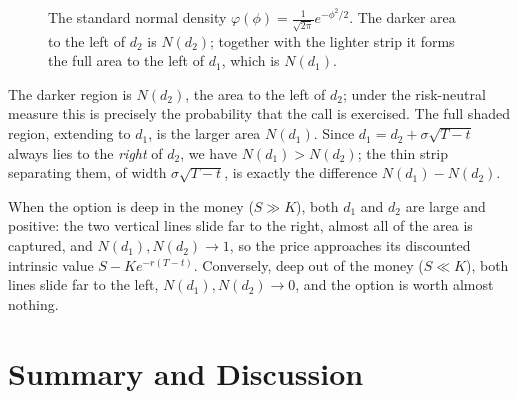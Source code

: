 \documentclass[a4paper,12pt]{article}
\numberwithin{equation}{section}
\begin{document}
\begin{figure}[h]
\centering
{}
\caption{The standard normal density $\varphi(\phi)=\tfrac{1}{\sqrt{2\pi}}e^{-\phi^2/2}$.
The darker area to the left of $d_2$ is $N(d_2)$; together with the lighter strip it
forms the full area to the left of $d_1$, which is $N(d_1)$.}
\label{fig:normal}
\end{figure}

The darker region is $N(d_2)$, the area to the left of $d_2$; under the
risk-neutral measure this is precisely the probability that the call is exercised.
The full shaded region, extending to $d_1$, is the larger area $N(d_1)$. Since
$d_1 = d_2 + \sigma\sqrt{T-t}$ always lies to the \emph{right} of $d_2$, we have
$N(d_1) > N(d_2)$; the thin strip separating them, of width $\sigma\sqrt{T-t}$,
is exactly the difference $N(d_1) - N(d_2)$.

When the option is deep in the money ($S \gg K$), both $d_1$ and $d_2$ are large and
positive: the two vertical lines slide far to the right, almost all of the area is
captured, and $N(d_1), N(d_2) \to 1$, so the price approaches its discounted
intrinsic value $S - K e^{-r(T-t)}$. Conversely, deep out of the money
($S \ll K$), both lines slide far to the left, $N(d_1), N(d_2) \to 0$, and the
option is worth almost nothing.

\section{Summary and Discussion}
\end{document}

